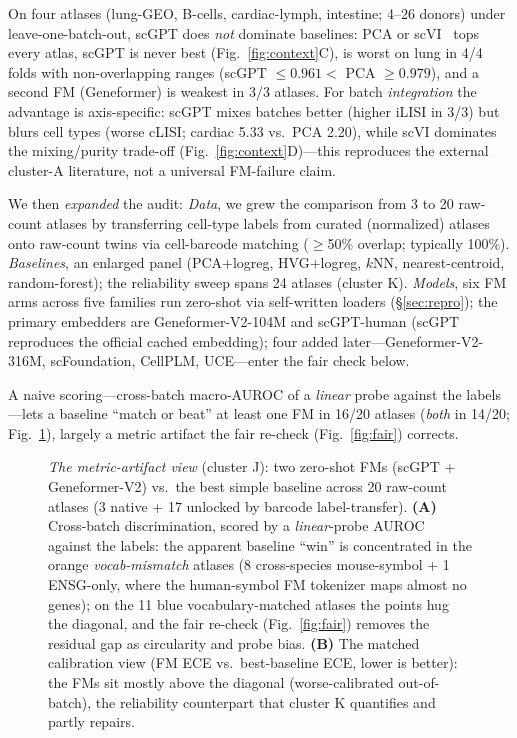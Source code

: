 \documentclass[journal]{IEEEtran}
\begin{document}
On four atlases (lung-GEO, B-cells, cardiac-lymph, intestine; 4--26 donors) under leave-one-batch-out, scGPT does \emph{not} dominate baselines: PCA or scVI~\cite{lopez2018} tops every atlas, scGPT is never best (Fig.~\ref{fig:context}C), is worst on lung in 4/4 folds with non-overlapping ranges (scGPT $\le 0.961 < $ PCA $\ge 0.979$), and a second FM (Geneformer) is weakest in 3/3 atlases. For batch \emph{integration} the advantage is axis-specific: scGPT mixes batches better (higher iLISI in 3/3) but blurs cell types (worse cLISI; cardiac 5.33 vs.\ PCA 2.20), while scVI dominates the mixing/purity trade-off (Fig.~\ref{fig:context}D)---this reproduces the external cluster-A literature, not a universal FM-failure claim.

We then \emph{expanded} the audit: \emph{Data}, we grew the comparison from 3 to 20 raw-count atlases by transferring cell-type labels from curated (normalized) atlases onto raw-count twins via cell-barcode matching ($\geq$50\% overlap; typically 100\%). \emph{Baselines}, an enlarged panel (PCA+logreg, HVG+logreg, $k$NN, nearest-centroid, random-forest); the reliability sweep spans 24 atlases (cluster K). \emph{Models}, six FM arms across five families run zero-shot via self-written loaders (\S\ref{sec:repro}); the primary embedders are Geneformer-V2-104M and scGPT-human (scGPT reproduces the official cached embedding); four added later---Geneformer-V2-316M, scFoundation, CellPLM, UCE---enter the fair check below.

A naive scoring---cross-batch macro-AUROC of a \emph{linear} probe against the labels---lets a baseline ``match or beat'' at least one FM in 16/20 atlases (\emph{both} in 14/20; Fig.~\ref{fig:fmvsbase}), largely a metric artifact the fair re-check (Fig.~\ref{fig:fair}) corrects.

\begin{figure}[!t]\centering
\resizebox{\textwidth}{!}{}
\caption{\emph{The metric-artifact view} (cluster J): two zero-shot FMs (scGPT + Geneformer-V2) vs.\ the best simple baseline across 20 raw-count atlases (3 native + 17 unlocked by barcode label-transfer). \textbf{(A)} Cross-batch discrimination, scored by a \emph{linear}-probe AUROC against the labels: the apparent baseline ``win'' is concentrated in the orange \emph{vocab-mismatch} atlases (8 cross-species mouse-symbol + 1 ENSG-only, where the human-symbol FM tokenizer maps almost no genes); on the 11 blue vocabulary-matched atlases the points hug the diagonal, and the fair re-check (Fig.~\ref{fig:fair}) removes the residual gap as circularity and probe bias. \textbf{(B)} The matched calibration view (FM ECE vs.\ best-baseline ECE, lower is better): the FMs sit mostly above the diagonal (worse-calibrated out-of-batch), the reliability counterpart that cluster K quantifies and partly repairs.}\label{fig:fmvsbase}\end{figure}
\end{document}
